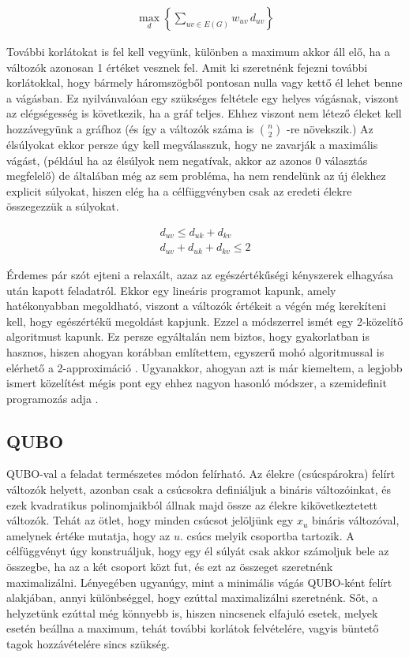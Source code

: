 \begin{align}
	\max_{d} \left\{ \sum_{uv\in E(G)}{w_{uv} \, d_{uv}}\right\}
\end{align}

További korlátokat is fel kell vegyünk, különben a maximum akkor áll elő, ha a változók azonosan 1 értéket vesznek fel.
Amit ki szeretnénk fejezni további korlátokkal, hogy bármely háromszögből pontosan nulla vagy kettő él lehet benne a vágásban. Ez nyilvánvalóan egy szükséges feltétele egy helyes vágásnak, viszont az elégségesség is következik, ha a gráf teljes. Ehhez viszont nem létező éleket kell hozzávegyünk a gráfhoz (és így a változók száma is $\binom{n}{2}$ -re növekszik.) Az élsúlyokat ekkor persze úgy kell megválasszuk, hogy ne zavarják a maximális vágást, (például ha az élsúlyok nem negatívak, akkor az azonos 0 választás megfelelő) de általában még az sem probléma, ha nem rendelünk az új élekhez explicit súlyokat, hiszen elég ha a célfüggvényben csak az eredeti élekre összegezzük a súlyokat.

\begin{align}
 d_{uv} \leq d_{uk}+d_{kv}  \\
 d_{uv}+d_{uk}+d_{kv} \leq 2  
\end{align}

Érdemes pár szót ejteni a relaxált, azaz az egészértékűségi kényszerek elhagyása után kapott feladatról. Ekkor egy lineáris programot kapunk, amely hatékonyabban megoldható, viszont a változók értékeit a végén még kerekíteni kell, hogy egészértékű megoldást kapjunk. Ezzel a módszerrel ismét egy 2-közelítő algoritmust kapunk. Ez persze egyáltalán nem biztos, hogy gyakorlatban is hasznos, hiszen ahogyan korábban említettem, egyszerű mohó algoritmussal is elérhető a 2-approximáció \cite{10.5555/1283383.1283390, POLJAK1994191}.
Ugyanakkor, ahogyan azt is már kiemeltem, a legjobb ismert közelítést mégis pont egy ehhez nagyon hasonló módszer, a szemidefinit programozás adja \cite{10.1145/227683.227684}.


\subsection{QUBO}\label{sec:theoryMaxCutQUBO}

QUBO-val a feladat természetes módon felírható. Az élekre (csúcspárokra) felírt változók helyett, azonban csak a csúcsokra definiáljuk a bináris változóinkat, és ezek kvadratikus polinomjaikból állnak majd össze az élekre kikövetkeztetett változók. Tehát az ötlet, hogy minden csúcsot jelöljünk egy $x_u$ bináris változóval, amelynek értéke mutatja, hogy az $u.$ csúcs melyik csoportba tartozik. A célfüggvényt úgy konstruáljuk, hogy egy él súlyát csak akkor számoljuk bele az összegbe, ha az a két csoport közt fut, és ezt az összeget szeretnénk maximalizálni.
Lényegében ugyanúgy, mint a minimális vágás QUBO-ként felírt alakjában, annyi különbséggel, hogy ezúttal maximalizálni szeretnénk. Sőt, a helyzetünk ezúttal még könnyebb is, hiszen nincsenek elfajuló esetek, melyek esetén beállna a maximum, tehát további korlátok felvételére, vagyis büntető tagok hozzávételére sincs szükség.

